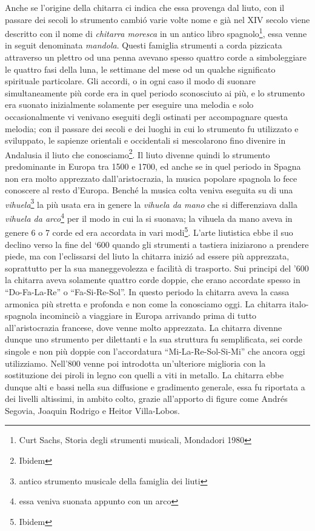 \documentclass[oneside]{article}
\begin{document}
\begin{multicols*}{2}
\noindent
Anche se l’origine della chitarra ci indica che essa provenga dal liuto, con il passare dei secoli lo strumento cambió varie volte nome e già nel XIV secolo viene descritto con il nome di \textit{chitarra moresca} in un antico libro spagnolo\footnote{Curt Sachs, Storia degli strumenti musicali, Mondadori 1980}, essa venne in seguit denominata \textit{mandola}.
Questi famiglia strumenti a corda pizzicata attraverso un plettro od una penna avevano spesso quattro corde a simboleggiare le quattro fasi della luna, le settimane del mese od un qualche significato spirituale particolare. Gli accordi, o in ogni caso il modo di suonare simultaneamente più corde era in quel periodo sconosciuto ai più, e lo strumento era suonato inizialmente solamente per eseguire una melodia e solo occasionalmente vi venivano eseguiti degli ostinati per accompagnare questa melodia; con il passare dei secoli e dei luoghi in cui lo strumento fu utilizzato e sviluppato, le sapienze orientali e occidentali si mescolarono fino divenire in Andalusia il liuto che conosciamo\footnote{Ibidem}.
Il liuto divenne quindi lo strumento predominante in Europa tra 1500 e 1700,  ed anche se in quel periodo in Spagna non era molto apprezzato dall’aristocrazia, la musica popolare spagnola lo fece conoscere al resto d’Europa. Benché la musica colta veniva eseguita su di una \textit{vihuela}\footnote{antico strumento musicale della famiglia dei liuti} la più usata era in genere la \textit{vihuela da mano} che si differenziava dalla \textit{vihuela da arco}\footnote{essa veniva suonata appunto con un arco} per il modo in cui la si suonava; la vihuela da mano aveva in genere 6 o 7 corde ed era accordata in vari modi\footnote{Ibidem}.
L’arte liutistica ebbe il suo declino verso la fine del ‘600 quando gli strumenti a tastiera iniziarono a prendere piede, ma con l'eclissarsi del liuto la chitarra inizió ad essere più apprezzata, soprattutto per la sua maneggevolezza e facilità di trasporto.
Sui principi del '600 la chitarra aveva solamente quattro corde doppie, che erano accordate spesso in “Do-Fa-La-Re” o “Fa-Si-Re-Sol”. 
In questo periodo la chitarra aveva la cassa armonica più stretta e profonda e non come la conosciamo oggi.
La chitarra italo-spagnola incominciò a viaggiare in Europa arrivando prima di tutto all’aristocrazia francese, dove venne molto apprezzata.
La chitarra divenne dunque uno strumento per dilettanti e la sua struttura fu semplificata, sei corde singole e non più doppie con l'accordatura “Mi-La-Re-Sol-Si-Mi” che ancora oggi utilizziamo.
Nell’800 venne poi introdotta un'ulteriore miglioria con la sostituzione dei piroli in legno con quelli a viti in metallo.
La chitarra ebbe dunque alti e bassi nella sua diffusione e gradimento generale,  essa fu riportata a dei livelli altissimi, in ambito colto, grazie all’apporto di figure come Andrés Segovia, Joaquin Rodrigo e Heitor Villa-Lobos.



\end{multicols*}
\end{document}
